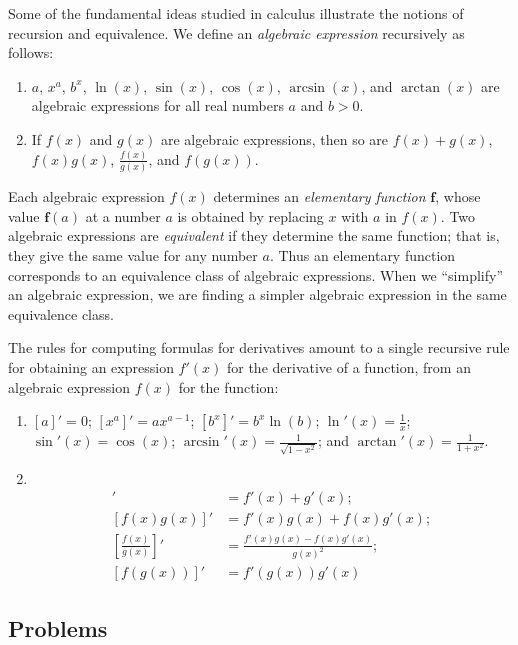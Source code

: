\documentclass{article}
\newcommand\fb{\mathbf f}
\newcommand{\0}{\mathbf 0}
\newcommand{\1}{\mathbf 1}
\begin{document}
Some of the fundamental ideas studied in calculus illustrate the notions of recursion and equivalence. We define an \emph{algebraic expression} recursively as follows:
\begin{enumerate}[\hspace{1cm}(1.)]
  \item $a$, $x^a$, $b^x$, $\ln(x)$, $\sin(x)$, $\cos(x)$, $\arcsin(x)$, and $\arctan(x)$ are algebraic expressions for all real numbers $a$ and $b > 0$.
  \item If $f(x)$ and $g(x)$ are algebraic expressions, then so are $f(x) + g(x)$, $f(x)g(x)$, $\frac{f(x)}{g(x)}$, and $f(g(x))$.
\end{enumerate}

Each algebraic expression $f(x)$ determines an \emph{elementary function} $\fb$, whose value $\fb (a)$ at a number $a$ is obtained by replacing $x$ with $a$ in $f(x)$. Two algebraic expressions are \emph{equivalent} if they determine the same function; that is, they give the same value for any number $a$. Thus an elementary function corresponds to an equivalence class of algebraic expressions. When we ``simplify'' an algebraic expression, we are finding a simpler algebraic expression in the same equivalence class.

The rules for computing formulas for derivatives amount to a single recursive rule for obtaining an expression $f'(x)$ for the derivative of a function, from an algebraic expression $f(x)$ for the function:
\begin{enumerate}[\hspace{1cm}(1.)]
  \item $[a]' = 0$; $[x^a]' = ax^{a-1}$; $[b^x]' = b^x \ln(b)$; $\ln'(x) = \frac{1}{x}$; $\sin'(x) = \cos(x)$; $\arcsin'(x) = \frac{1}{\sqrt{1-x^2}}$; and $\arctan'(x) = \frac{1}{1 + x^2}$.
  \item $\ $
    \begin{align*}
    [f(x)+g(x)]' &= f'(x) + g'(x); \\
    [f(x) g(x)]' &= f'(x)g(x) + f(x)g'(x); \\
    \left[ \frac{f(x)}{g(x)} \right]' &= \frac{f'(x)g(x) - f(x)g'(x)}{g(x)^2}; \\
    [f(g(x))]' &= f'(g(x)) g'(x)
    \end{align*}
\end{enumerate}


\subsection*{Problems}
\end{document}

